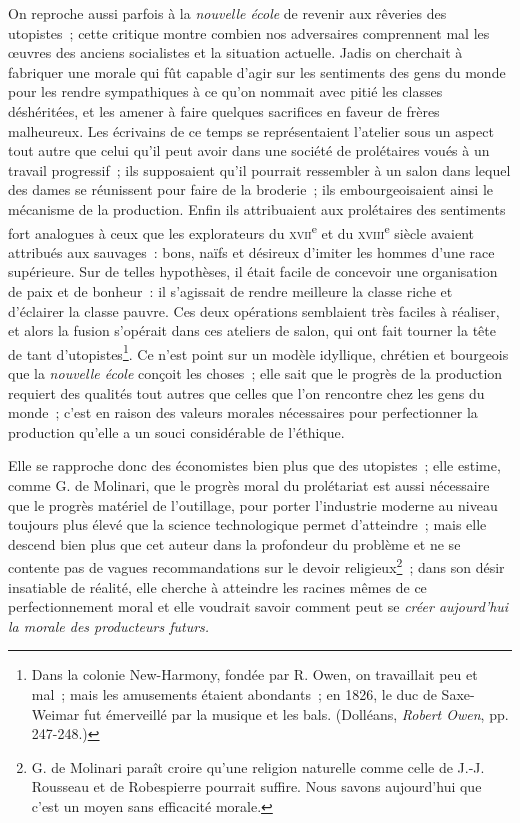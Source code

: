 \documentclass[french,twoside]{book} %
\begin{document}
On reproche aussi parfois à la \emph{nouvelle école} de revenir aux rêveries des utopistes ; cette critique montre combien nos adversaires comprennent mal les œuvres des anciens socialistes et la situation actuelle. Jadis on cherchait à fabriquer une morale qui fût capable d’agir sur les sentiments des gens du monde pour les rendre sympathiques à ce qu’on nommait avec pitié les classes déshéritées, et les amener à faire quelques sacrifices en faveur de frères malheureux. Les écrivains de ce temps se représentaient l’atelier sous un aspect tout autre que celui qu’il peut avoir dans une société de prolétaires voués à un travail progressif ; ils supposaient qu’il pourrait ressembler à un salon dans lequel des dames se réunissent pour faire de la broderie ; ils embourgeoisaient ainsi le mécanisme de la production. Enfin ils attribuaient aux prolétaires des sentiments fort analogues à ceux que les explorateurs du {\scshape xvii}\textsuperscript{e} et du {\scshape xviii}\textsuperscript{e} siècle avaient attribués aux sauvages : bons, naïfs et désireux d’imiter les hommes d’une race supérieure. Sur de telles hypothèses, il était facile de concevoir une organisation de paix et de bonheur : il s’agissait de rendre meilleure la classe riche et d’éclairer la classe pauvre. Ces deux opérations semblaient très faciles à réaliser, et alors la fusion s’opérait dans ces ateliers de salon, qui ont fait tourner la tête de  tant d’utopistes\footnote{ \noindent Dans la colonie New-Harmony, fondée par R. Owen, on travaillait peu et mal ; mais les amusements étaient abondants ; en 1826, le duc de Saxe-Weimar fut émerveillé par la musique et les bals. (Dolléans, \emph{Robert Owen}, pp. 247-248.)
 }. Ce n’est point sur un modèle idyllique, chrétien et bourgeois que la \emph{nouvelle école} conçoit les choses ; elle sait que le progrès de la production requiert des qualités tout autres que celles que l’on rencontre chez les gens du monde ; c’est en raison des valeurs morales nécessaires pour perfectionner la production qu’elle a un souci considérable de l’éthique.\par
Elle se rapproche donc des économistes bien plus que des utopistes ; elle estime, comme G. de Molinari, que le progrès moral du prolétariat est aussi nécessaire que le progrès matériel de l’outillage, pour porter l’industrie moderne au niveau toujours plus élevé que la science technologique permet d’atteindre ; mais elle descend bien plus que cet auteur dans la profondeur du problème et ne se contente pas de vagues recommandations sur le devoir religieux\footnote{ \noindent G. de Molinari paraît croire qu’une religion naturelle comme celle de J.-J. Rousseau et de Robespierre pourrait suffire. Nous savons aujourd’hui que c’est un moyen sans efficacité morale.
 } ; dans son désir insatiable de réalité, elle cherche à atteindre les racines mêmes de ce perfectionnement moral et elle voudrait savoir comment peut se \emph{créer aujourd’hui la morale des producteurs futurs.}
\end{document}

